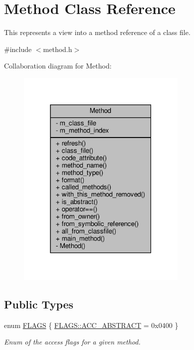 \hypertarget{classMethod}{}\section{Method Class Reference}
\label{classMethod}


This represents a view into a method reference of a class file.  




{\ttfamily \#include $<$method.\+h$>$}



Collaboration diagram for Method\+:
\nopagebreak
\begin{figure}[H]
\begin{center}
\leavevmode
\includegraphics[width=231pt]{classMethod__coll__graph}
\end{center}
\end{figure}
\subsection*{Public Types}
\begin{DoxyCompactItemize}
\item 
enum \hyperlink{classMethod_a142a92c7e2c79cbbedb7fd08a8a8e1ad}{F\+L\+A\+GS} \{ \hyperlink{classMethod_a142a92c7e2c79cbbedb7fd08a8a8e1adaade04c031729a1f18ba2bb86e7aeddfc}{F\+L\+A\+G\+S\+::\+A\+C\+C\+\_\+\+A\+B\+S\+T\+R\+A\+CT} = 0x0400
 \}\begin{DoxyCompactList}\small\item\em Enum of the access flags for a given method. \end{DoxyCompactList}
\end{DoxyCompactItemize}
